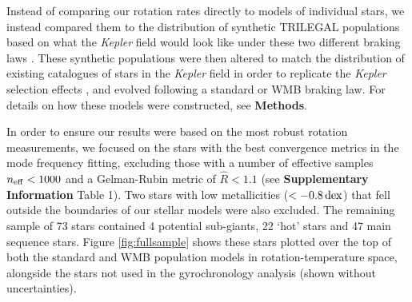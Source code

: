 \documentclass[12pt]{article}
\newcommand{\kepler}{\emph{Kepler}\xspace}
\newcommand{\rtwo}[1]{{#1}}
\begin{document}
Instead of comparing our rotation rates directly to models of individual stars, we instead compared them to \rtwo{the distribution of} synthetic TRILEGAL populations based on what the \textit{Kepler} field would look like under these two different braking laws \cite{vansaders+2019, girardi+2012}. These synthetic populations were then altered to match the distribution of existing catalogues of stars in the \kepler field in order to replicate the \kepler selection effects \cite{berger+2020}, and evolved following a standard or WMB braking law. For details on how these models were constructed, see \textbf{Methods}.

In order to ensure our results were based on the most robust rotation measurements, we focused on the stars with the best convergence metrics in the mode frequency fitting, excluding those with a number of effective samples $n_{\rm eff} < 1000$ and a Gelman-Rubin metric of $\hat{R}<1.1$ \cite{gelman+rubin1992,salvatier+2016} (see  \textbf{Supplementary Information} Table 1). Two stars with low metallicities ($< -0.8\, \rm {dex}$) that fell outside the boundaries of our stellar models were also excluded. The remaining sample of 73 stars contained 4 potential sub-giants, 22 `hot' stars and 47 main sequence stars. Figure \ref{fig:fullsample} shows these stars plotted over the top of both the standard and WMB population models in rotation-temperature space, alongside the stars not used in the gyrochronology analysis (shown without uncertainties).
\end{document}
